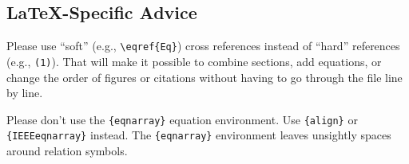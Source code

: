 \documentclass[conference]{IEEEtran}
\begin{document}



\subsection{\LaTeX-Specific Advice}

Please use ``soft'' (e.g., \verb|\eqref{Eq}|) cross references instead
of ``hard'' references (e.g., \verb|(1)|). That will make it possible
to combine sections, add equations, or change the order of figures or
citations without having to go through the file line by line.

Please don't use the \verb|{eqnarray}| equation environment. Use
\verb|{align}| or \verb|{IEEEeqnarray}| instead. The \verb|{eqnarray}|
environment leaves unsightly spaces around relation symbols.
\end{document}
